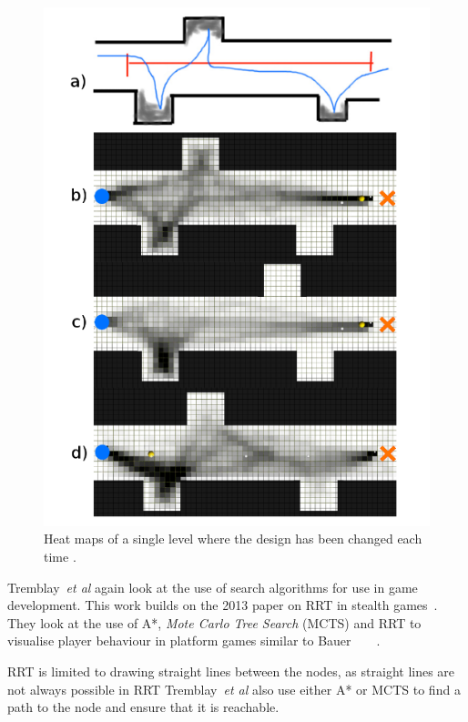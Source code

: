\documentclass[journal]{IEEEtran}
\begin{document}
\begin{figure}[h]
	\includegraphics[width=1.0\linewidth]{TremblayHeatMap.png}
	\caption{ Heat maps of a single level where the design has been changed each time \cite{Tremblay2013}.}
	\label{TremblayHeatMap}
\end{figure} 

Tremblay~\textit{et al} again look at the use of search algorithms for use in game development. This work builds on the 2013 paper on RRT in stealth games~\cite{Tremblay2014}. They look at the use of A*, \textit{Mote Carlo Tree Search} (MCTS) and RRT to visualise player behaviour in platform games similar to Bauer ~\cite{Tremblay2014}  ~\cite{bauer2012} . 

RRT is limited to drawing straight lines between the nodes, as straight lines are not always possible in RRT  Tremblay~\textit{et al} also use either A* or MCTS to find a path to the node and ensure that it is reachable.
\end{document}
